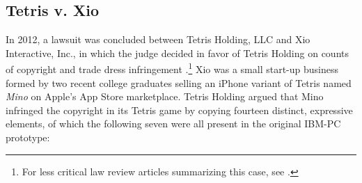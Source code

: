 \subsection*{Tetris v. Xio}
In 2012, a lawsuit was concluded between Tetris Holding, LLC and Xio Interactive, Inc., in which the judge decided in favor of Tetris Holding on counts of copyright and trade dress infringement \autocite{tetris-xio}.\footnote{
  For less critical law review articles summarizing this case, see \autocites{Lampros13}{Casillas13}.
}
Xio was a small start-up business formed by two recent college graduates selling an iPhone variant of Tetris named \emph{Mino} on Apple's App Store marketplace. Tetris Holding argued that Mino infringed the copyright in its Tetris game by copying fourteen distinct, expressive elements, of which the following seven were all present in the original IBM-PC prototype:
